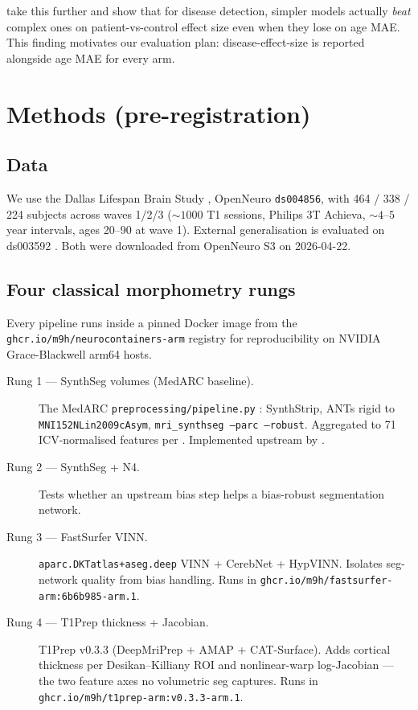 \documentclass[11pt]{article}
\begin{document}
\citet{schulz2025} take this further and show that for disease
detection, simpler models actually \emph{beat} complex ones on
patient-vs-control effect size even when they lose on age MAE. This
finding motivates our evaluation plan: disease-effect-size is reported
alongside age MAE for every arm.

\section{Methods (pre-registration)}

\subsection{Data}

We use the Dallas Lifespan Brain Study \citep{park2025dlbs}, OpenNeuro
\texttt{ds004856}, with 464 / 338 / 224 subjects across waves 1/2/3
($\sim 1000$ T1 sessions, Philips 3T Achieva, $\sim 4$--$5$ year
intervals, ages \numrange{20}{90} at wave 1). External generalisation
is evaluated on ds003592 \citep{spreng2022}. Both were downloaded from
OpenNeuro S3 on 2026-04-22.

\subsection{Four classical morphometry rungs}

Every pipeline runs inside a pinned Docker image from the
\texttt{ghcr.io/m9h/neurocontainers-arm} registry for reproducibility
on NVIDIA Grace-Blackwell arm64 hosts.

\begin{description}
  \item[Rung 1 --- SynthSeg volumes (MedARC baseline).] The MedARC
    \texttt{preprocessing/pipeline.py} \citep{medarcsmrifm2026}:
    SynthStrip, ANTs rigid to \texttt{MNI152NLin2009cAsym},
    \texttt{mri\_synthseg --parc --robust}. Aggregated to 71
    ICV-normalised features per \citet{bethlehem2022}. Implemented
    upstream by \citet{NimaAshtari2026}.

  \item[Rung 2 --- SynthSeg + N4.] Tests whether an upstream bias
    step helps a bias-robust segmentation network.

  \item[Rung 3 --- FastSurfer VINN.] \texttt{aparc.DKTatlas+aseg.deep}
    VINN + CerebNet + HypVINN. Isolates seg-network quality from bias
    handling. Runs in
    \texttt{ghcr.io/m9h/fastsurfer-arm:6b6b985-arm.1}.

  \item[Rung 4 --- T1Prep thickness + Jacobian.] T1Prep v0.3.3
    \citep{t1prep} (DeepMriPrep + AMAP + CAT-Surface). Adds cortical
    thickness per Desikan--Killiany ROI and nonlinear-warp log-Jacobian
    --- the two feature axes no volumetric seg captures. Runs in
    \texttt{ghcr.io/m9h/t1prep-arm:v0.3.3-arm.1}.
\end{description}
\end{document}
